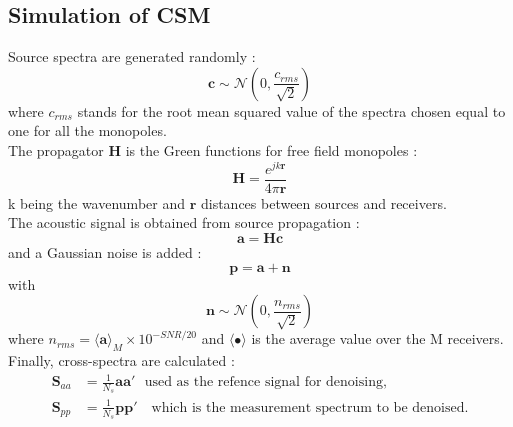 \documentclass[fontsize=12pt,DIV13,paper=a4,abstract=true,titlepage=false]{scrartcl}
\newcommand{\bo}[1]{ \mathbf{#1} }
\begin{document}
\subsection{Simulation of CSM}
Source spectra are generated randomly  :
\begin{equation}
	\bo{c}\sim \mathcal{N}(0,\frac{c_{rms}}{\sqrt{2}})
\end{equation}
where $c_{rms}$ stands for the root mean squared value of the spectra chosen equal to one for all the monopoles.\\

The propagator $\bo{H}$ is the Green functions for free field monopoles : 
\begin{equation}
	\bo{H}=\frac{e^{j k \bo{r}}}{4 \pi \bo{r}}
\end{equation}
k being the wavenumber and $\bo{r}$ distances between sources and receivers.\\

The acoustic signal is obtained from source propagation : \\
\begin{equation}
    \bo{a} = \bo{Hc}
\end{equation}
and a Gaussian noise is added : 
\begin{equation}
    \bo{p} = \bo{a} + \bo{n}
\end{equation}
with
\begin{equation}
    \bo{n}\sim \mathcal{N}(0,\frac{n_{rms}}{\sqrt{2}})
\end{equation}
where $n_{rms}=\langle \bo{a} \rangle_M \times 10^{-SNR/20}$ and $\langle \bullet \rangle$ is the average value over the M receivers.\\

Finally, cross-spectra are calculated : 
\begin{align}
\bo{S}_{aa} &= \frac{1}{N_s}\bo{aa'}~~~\text{used as the refence signal for denoising,}\\
\bo{S}_{pp} &= \frac{1}{N_s}\bo{pp'}~~~\text{ which is the measurement spectrum to be denoised.}
\end{align}
\end{document}
